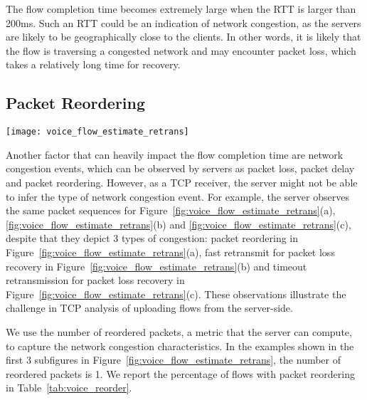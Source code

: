 The flow completion time becomes extremely large when the RTT is larger than 200ms. Such an RTT could be an indication of network congestion, as the servers are likely to be geographically close to the clients. In other words, it is likely that the flow is traversing a congested network and may encounter packet loss, which takes a relatively long time for recovery.

\subsection{Packet Reordering}
\label{sec:v_pd}

\begin{figure*}[th]
\centering
	\texttt{[image: voice\_flow\_estimate\_retrans]}
\caption{Server could not distinguish packet reordering events, which are (a) packet reordering, (b) fast retransmit, and (c) timeout retransmission. Server may identify some timeout retransmissions as long packet delay (d).}
\label{fig:voice_flow_estimate_retrans}
\minsqueeze
\end{figure*}

Another factor that can heavily impact the flow completion time are network congestion events, which can be observed by servers as packet loss, packet delay and packet reordering. However, as a TCP receiver, the server might not be able to infer the type of network congestion event. For example, the server observes the same packet sequences for Figure~\ref{fig:voice_flow_estimate_retrans}(a), \ref{fig:voice_flow_estimate_retrans}(b) and \ref{fig:voice_flow_estimate_retrans}(c), despite that they depict 3 types of congestion: packet reordering in Figure~\ref{fig:voice_flow_estimate_retrans}(a), fast retransmit for packet loss recovery in Figure~\ref{fig:voice_flow_estimate_retrans}(b) and timeout retransmission for packet loss recovery in Figure~\ref{fig:voice_flow_estimate_retrans}(c). These observations illustrate the challenge in TCP analysis of uploading flows from the server-side.

We use the number of reordered packets, a metric that the server can compute, to capture the network congestion characteristics. In the examples shown in the first 3 subfigures in Figure~\ref{fig:voice_flow_estimate_retrans}, the number of reordered packets is 1. %
We report the percentage of flows with packet reordering in Table~\ref{tab:voice_reorder}.

